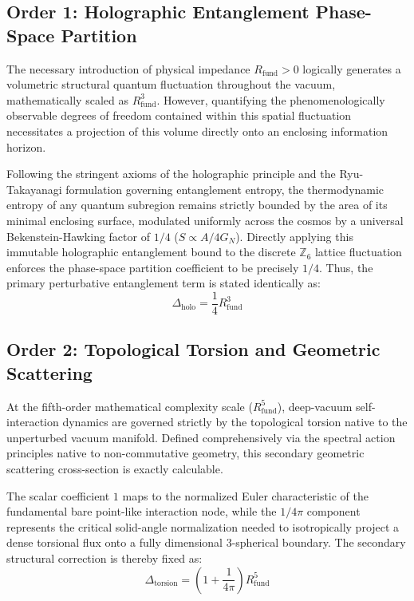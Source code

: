 \documentclass[12pt,a4paper]{article}
\begin{document}
\subsection{Order 1: Holographic Entanglement Phase-Space Partition}

The necessary introduction of physical impedance $R_{\text{fund}} > 0$ logically generates a volumetric structural quantum fluctuation throughout the vacuum, mathematically scaled as $R_{\text{fund}}^3$. However, quantifying the phenomenologically observable degrees of freedom contained within this spatial fluctuation necessitates a projection of this volume directly onto an enclosing information horizon. 

Following the stringent axioms of the holographic principle and the Ryu-Takayanagi formulation governing entanglement entropy, the thermodynamic entropy of any quantum subregion remains strictly bounded by the area of its minimal enclosing surface, modulated uniformly across the cosmos by a universal Bekenstein-Hawking factor of $1/4$ ($S \propto A/4G_N$). Directly applying this immutable holographic entanglement bound to the discrete $\mathbb{Z}_6$ lattice fluctuation enforces the phase-space partition coefficient to be precisely $1/4$. Thus, the primary perturbative entanglement term is stated identically as:
\begin{equation}
\Delta_{\text{holo}} = \frac{1}{4} R_{\text{fund}}^3
\end{equation}

\subsection{Order 2: Topological Torsion and Geometric Scattering}

At the fifth-order mathematical complexity scale ($R_{\text{fund}}^5$), deep-vacuum self-interaction dynamics are governed strictly by the topological torsion native to the unperturbed vacuum manifold. Defined comprehensively via the spectral action principles native to non-commutative geometry, this secondary geometric scattering cross-section is exactly calculable. 

The scalar coefficient $1$ maps to the normalized Euler characteristic of the fundamental bare point-like interaction node, while the $1/4\pi$ component represents the critical solid-angle normalization needed to isotropically project a dense torsional flux onto a fully dimensional 3-spherical boundary. The secondary structural correction is thereby fixed as:
\begin{equation}
\Delta_{\text{torsion}} = \left(1 + \frac{1}{4\pi}\right) R_{\text{fund}}^5
\end{equation}
\end{document}
